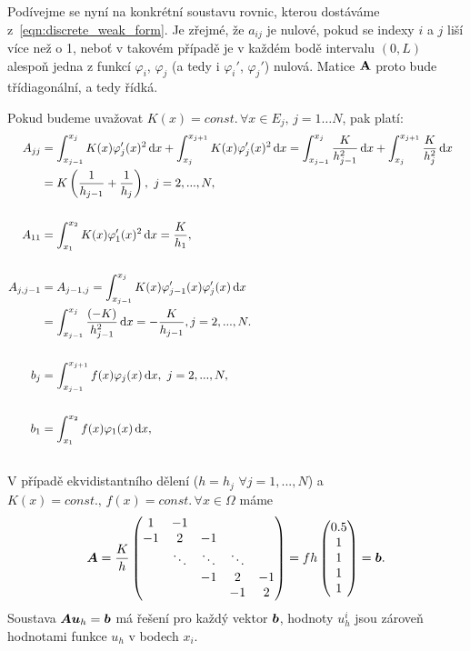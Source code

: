 Podívejme se nyní na konkrétní soustavu rovnic, kterou dostáváme z~\eqref{eqn:discrete_weak_form}.
Je zřejmé, že $a_{ij}$ je nulové, pokud se indexy $i$ a $j$ liší více než o 1, neboť v takovém případě je v každém bodě intervalu $(0,L)$ alespoň jedna z funkcí $\varphi_i$, $\varphi_j$ (a tedy i $\varphi_i'$, $\varphi_j'$) nulová. Matice $\mathbf{A}$ proto bude třídiagonální, a tedy řídká.

Pokud budeme uvažovat $K(x) = const.\, \forall x\in E_j,\, j = 1\ldots N$, pak platí:
\begin{align*}
A_{jj} &= \int_{x_{j-1}}^{x_j} K(x)\varphi_j'(x)^2\,{\rm d} x + \int_{x_j}^{x_{j+1}} K(x) \varphi_j'(x)^2\,{\rm d} x
= \int_{x_{j-1}}^{x_j}\frac{K}{h_{j-1}^2}\,{\rm d} x + \int_{x_j}^{x_{j+1}}\frac{K}{h_j^2}\,{\rm d} x\\
&= K\left(\frac1{h_{j-1}} + \frac1{h_j}\right),~j=2,...,N,\\\\
A_{11} &= \int_{x_1}^{x_{2}} K(x) \varphi_1'(x)^2\,{\rm d} x
= \frac{K}{h_1},&\\\\
A_{j,j-1} &= A_{j-1,j} = \int_{x_{j-1}}^{x_j}K(x)\varphi_{j-1}'(x)\varphi_j'(x)\,{\rm d} x\\
&= \int_{x_{j-1}}^{x_j}\frac{(-K)}{h_{j-1}^2} \,{\rm d} x = -\frac{K}{h_{j-1}}, j=2,...,N.\\\\
b_j &= \int_{x_{j-1}}^{x_{j+1}} f(x)\varphi_j(x)\,{\rm d} x,~j=2,...,N,&\\\\
b_1 &= \int_{x_1}^{x_2} f(x)\varphi_1(x)\,{\rm d} x,&\\\\
\end{align*}
V případě ekvidistantního dělení ($h=h_j$ $\forall j=1,...,N$) a $K(x) = const.,\,f(x)=const.\, \forall x\in\Omega$ máme
\[
  \mathbf{\boldsymbol{A}} = \frac{K}{h}\begin{pmatrix}1 & -1 &&& \\-1 & 2 & -1&&\\&\ddots&\ddots&\ddots&\\&&-1 & 2 & -1\\&&& -1 & 2\end{pmatrix}
  = fh\begin{pmatrix}0.5\\1\\1\\1\\1\end{pmatrix}= \mathbf{\boldsymbol{b}}.
\]
Soustava $\mathbf{\boldsymbol{A}}\mathbf{\boldsymbol{u}}_h=\mathbf{\boldsymbol{b}}$ má řešení pro každý vektor $\mathbf{\boldsymbol{b}}$,
hodnoty $u_h^i$ jsou zároveň hodnotami funkce $u_h$ v bodech $x_i$.


